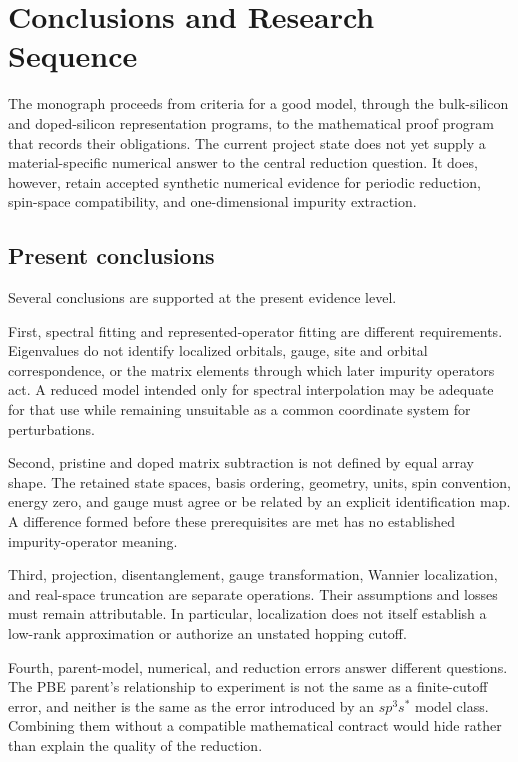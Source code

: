 \chapter{Conclusions and Research Sequence}

\label{ch:conclusions-and-outlook}


The monograph proceeds from criteria for a good model, through the bulk-silicon
and doped-silicon representation programs, to the mathematical proof program
that records their obligations. The current project state does not yet supply a
material-specific numerical answer to the central reduction question. It does,
however, retain accepted synthetic numerical evidence for periodic reduction,
spin-space compatibility, and one-dimensional impurity extraction.

\section{Present conclusions}

Several conclusions are supported at the present evidence level.

First, spectral fitting and represented-operator fitting are different
requirements. Eigenvalues do not identify localized orbitals, gauge, site and
orbital correspondence, or the matrix elements through which later impurity
operators act. A reduced model intended only for spectral interpolation may be
adequate for that use while remaining unsuitable as a common coordinate system
for perturbations.

Second, pristine and doped matrix subtraction is not defined by equal array
shape. The retained state spaces, basis ordering, geometry, units, spin
convention, energy zero, and gauge must agree or be related by an explicit
identification map. A difference formed before these prerequisites are met has
no established impurity-operator meaning.

Third, projection, disentanglement, gauge transformation, Wannier localization,
and real-space truncation are separate operations. Their assumptions and losses
must remain attributable. In particular, localization does not itself establish
a low-rank approximation or authorize an unstated hopping cutoff.

Fourth, parent-model, numerical, and reduction errors answer different
questions. The PBE parent's relationship to experiment is not the same as a
finite-cutoff error, and neither is the same as the error introduced by an
$sp^3s^{\ast}$ model class. Combining them without a compatible mathematical
contract would hide rather than explain the quality of the reduction.

